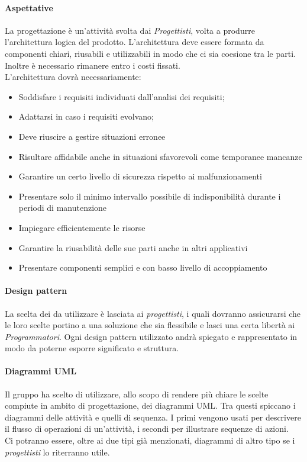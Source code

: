 \documentclass[../norme_di_progetto.tex]{subfiles}
\begin{document}
 \paragraph{Aspettative}
 La progettazione è un'attività svolta dai \emph{Progettisti}, volta a produrre l'architettura logica del prodotto. L'architettura deve essere formata da componenti chiari, riusabili e utilizzabili in modo che ci sia coesione tra le parti. Inoltre è necessario rimanere entro i costi fissati.\\
 L'architettura dovrà necessariamente: 
 \begin{itemize}
     \item Soddisfare i requisiti individuati dall'analisi dei requisiti;
     \item Adattarsi in caso i requisiti evolvano;
     \item Deve riuscire a gestire situazioni erronee
     \item Risultare affidabile anche in situazioni sfavorevoli come temporanee mancanze
     \item Garantire un certo livello di sicurezza rispetto ai malfunzionamenti
     \item Presentare solo il minimo intervallo possibile di indisponibilità durante i periodi di manutenzione
     \item Impiegare efficientemente le risorse
     \item Garantire la riusabilità delle sue parti anche in altri applicativi
     \item Presentare componenti semplici e con basso livello di accoppiamento
 \end{itemize}
 
 
 \paragraph{Design pattern}
 La scelta dei  da utilizzare è lasciata ai \emph{progettisti}, i quali dovranno assicurarsi che le loro scelte portino a una soluzione che sia flessibile e lasci una certa libertà ai \emph{Programmatori}. Ogni design pattern utilizzato andrà spiegato e rappresentato in modo da poterne esporre significato e struttura.
 
 \paragraph{Diagrammi UML}
 Il gruppo ha scelto di utilizzare, allo scopo di rendere più chiare le scelte compiute in ambito di progettazione, dei diagrammi UML. Tra questi spiccano i diagrammi delle attività e quelli di sequenza. I primi vengono usati per descrivere il flusso di operazioni di un'attività, i secondi per illustrare sequenze di azioni.\\
 Ci potranno essere, oltre ai due tipi già menzionati, diagrammi di altro tipo se i \emph{progettisti} lo riterranno utile.
 
\end{document}

